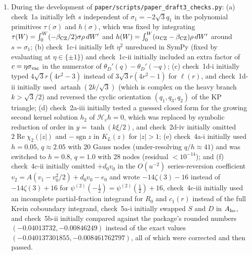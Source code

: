 \documentclass[11pt,a4paper]{article}
\newcommand{\scr}[1]{\nolinkurl{#1}}
\newcommand{\sgn}{\operatorname{sgn}}
\theoremstyle{remark}
\begin{document}
\begin{enumerate}
\item During the development of \scr{paper/scripts/paper_draft3_checks.py}: (a) check~1a initially left $s$ independent of $\sigma_1=-2\sqrt3q_1$ in the polynomial primitives $\tau(\sigma)$ and $h(\sigma)$, which was fixed by integrating $\tau(W)=\int_0^W(-\beta_{\rm CZ}/2)\sigma\rho\,dW'$ and $h(W)=\int_0^W(\alpha_{\rm CZ}-\beta_{\rm CZ})\rho\,dW'$ around $s=\sigma_1$; (b) check~1c-i initially left $\eta^2$ unreduced in SymPy (fixed by evaluating at $\eta\in\{\pm1\}$) and check~1c-ii initially included an extra factor of $c=\eta\sigma_{\rm vac}$ in the numerator of $\theta_D'(q)-\theta_D'(-q)$; (c) check~1d-i initially typed $4\sqrt3r(4r^2-3)$ instead of $3\sqrt3r(4r^2-1)$ for $\ell(r)$, and check~1d-ii initially used $\operatorname{artanh}(2k/\sqrt3)$ (which is complex on the heavy branch $k>\sqrt3/2$) and reversed the cyclic orientation $(q_1,q_3,q_2)$ of the KP triangle; (d) check~2a-iii initially tested a guessed closed form for the growing second kernel solution $h_2$ of $\mathcal H_vh=0$, which was replaced by symbolic reduction of order in $y=\tanh(k\xi/2)$, and check~2d-iv initially omitted $2\operatorname{Re}\chi_2(|z|)$ and $-\sgn z$ in $K_L(z)$ for $|z|>1$; (e) check~4a-i initially used $h=0.05$, $q\approx2.05$ with 20 Gauss nodes (under-resolving $q/h\approx41$) and was switched to $h=0.8$, $q=1.0$ with 28 nodes (residual $<10^{-14}$); and (f) check~4c-ii initially omitted $+d_0v_0$ in the $O(u^{-2})$ series-reversion coefficient $v_2=A(v_1-v_0^2/2)+d_0v_0-e_0$ and wrote $-14\zeta(3)-16$ instead of $-14\zeta(3)+16$ for $\psi^{(2)}(-\tfrac12)=\psi^{(2)}(\tfrac12)+16$, check~4c-iii initially used an incomplete partial-fraction integrand for $R_0$ and $c_1(r)$ instead of the full Krein coboundary integrand, check~5a-i initially swapped $S$ and $D$ in $A_{\rm ho}$, and check~5b-ii initially compared against the package's rounded numbers $(-0.04013732,-0.00846249)$ instead of the exact values $(-0.040137301855,-0.008461762797)$, all of which were corrected and then passed.

\end{enumerate}
\end{document}
